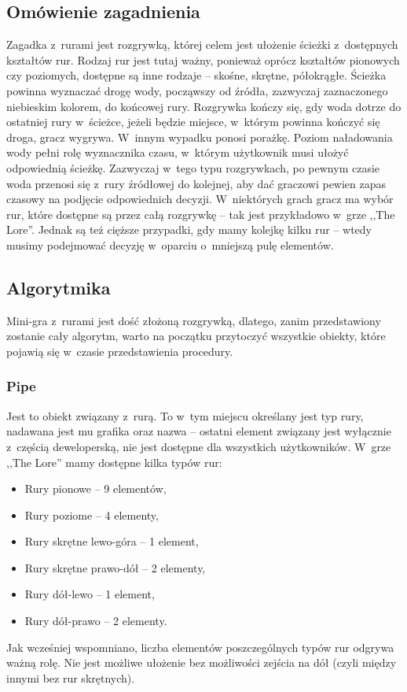 \documentclass[oneside,polski,logo]{amuthesis}
\begin{document}
\subsection{Omówienie zagadnienia}
\par Zagadka z~rurami jest rozgrywką, której celem jest ułożenie ścieżki z~dostępnych kształtów rur. Rodzaj rur jest tutaj ważny, ponieważ oprócz kształtów pionowych czy poziomych, dostępne są inne rodzaje – skośne, skrętne, półokrągłe.
Ścieżka powinna wyznaczać drogę wody, począwszy od źródła, zazwyczaj zaznaczonego niebieskim kolorem, do końcowej rury. Rozgrywka kończy się, gdy woda dotrze do ostatniej rury w~ścieżce, jeżeli będzie miejsce, w~którym powinna kończyć się droga, gracz wygrywa. W~innym wypadku ponosi porażkę.
Poziom naładowania wody pełni rolę wyznacznika czasu, w~którym użytkownik musi ułożyć odpowiednią ścieżkę. Zazwyczaj w~tego typu rozgrywkach, po pewnym czasie woda przenosi się z~rury źródłowej do kolejnej, aby dać graczowi pewien zapas czasowy na podjęcie odpowiednich decyzji. W~niektórych grach gracz ma wybór rur, które dostępne są przez całą rozgrywkę – tak jest przykładowo w~grze ,,The Lore''. Jednak są też cięższe przypadki, gdy mamy kolejkę kilku rur – wtedy musimy podejmować decyzję w~oparciu o~mniejszą pulę elementów.
\subsection{Algorytmika}
\par Mini-gra z~rurami jest dość złożoną rozgrywką, dlatego, zanim przedstawiony zostanie cały algorytm, warto na początku przytoczyć wszystkie obiekty, które pojawią się w~czasie przedstawienia procedury.
\subsubsection{Pipe}
\par Jest to obiekt związany z~rurą. To w~tym miejscu określany jest typ rury, nadawana jest mu grafika oraz nazwa – ostatni element związany jest wyłącznie z~częścią deweloperską, nie jest dostępne dla wszystkich użytkowników. W~grze ,,The Lore'' mamy dostępne kilka typów rur:
\begin{itemize}
  \item Rury pionowe – 9 elementów,
  \item Rury poziome – 4 elementy,
  \item Rury skrętne lewo-góra – 1 element,
  \item Rury skrętne prawo-dół – 2 elementy,
  \item Rury dół-lewo –  1 element,
  \item Rury dół-prawo – 2 elementy.
\end{itemize}
Jak wcześniej wspomniano, liczba elementów poszczególnych typów rur odgrywa ważną rolę. Nie jest możliwe ułożenie bez możliwości zejścia na dół (czyli między innymi bez rur skrętnych). 
\end{document}
